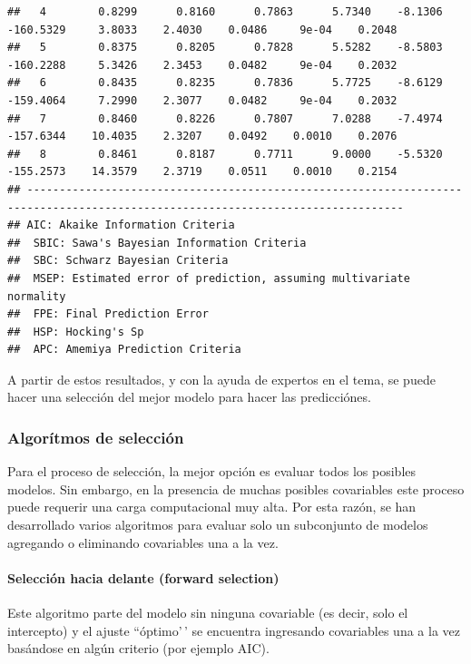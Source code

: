 \documentclass[
]{article}
\begin{document}
\begin{verbatim}
##   4        0.8299      0.8160      0.7863      5.7340    -8.1306    -160.5329     3.8033    2.4030    0.0486     9e-04    0.2048 
##   5        0.8375      0.8205      0.7828      5.5282    -8.5803    -160.2288     5.3426    2.3453    0.0482     9e-04    0.2032 
##   6        0.8435      0.8235      0.7836      5.7725    -8.6129    -159.4064     7.2990    2.3077    0.0482     9e-04    0.2032 
##   7        0.8460      0.8226      0.7807      7.0288    -7.4974    -157.6344    10.4035    2.3207    0.0492    0.0010    0.2076 
##   8        0.8461      0.8187      0.7711      9.0000    -5.5320    -155.2573    14.3579    2.3719    0.0511    0.0010    0.2154 
## --------------------------------------------------------------------------------------------------------------------------------
## AIC: Akaike Information Criteria 
##  SBIC: Sawa's Bayesian Information Criteria 
##  SBC: Schwarz Bayesian Criteria 
##  MSEP: Estimated error of prediction, assuming multivariate normality 
##  FPE: Final Prediction Error 
##  HSP: Hocking's Sp 
##  APC: Amemiya Prediction Criteria
\end{verbatim}

A partir de estos resultados, y con la ayuda de expertos en el tema, se puede hacer una selección del mejor modelo para hacer las predicciónes.

\hypertarget{algoruxedtmos-de-selecciuxf3n}{%
\subsubsection{Algorítmos de selección}\label{algoruxedtmos-de-selecciuxf3n}}

Para el proceso de selección, la mejor opción es evaluar todos los posibles modelos. Sin embargo, en la presencia de muchas posibles covariables este proceso puede requerir una carga computacional muy alta. Por esta razón, se han desarrollado varios algoritmos para evaluar solo un subconjunto de modelos agregando o eliminando covariables una a la vez.

\hypertarget{selecciuxf3n-hacia-delante-forward-selection}{%
\paragraph{Selección hacia delante (forward selection)}\label{selecciuxf3n-hacia-delante-forward-selection}}

Este algoritmo parte del modelo sin ninguna covariable (es decir, solo el intercepto) y el ajuste ``óptimo'\,' se encuentra ingresando covariables una a la vez basándose en algún criterio (por ejemplo AIC).
\end{document}
